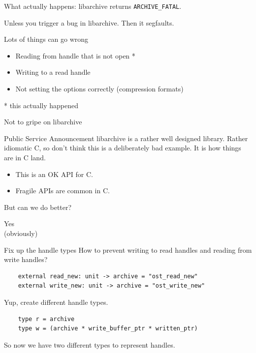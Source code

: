 \documentclass{beamer}
\renewcommand{\example}[1]{{\usebeamercolor[fg]{example text} #1}}
\begin{document}
\begin{frame}
  What actually happens: libarchive returns \texttt{ARCHIVE\_FATAL}.\pause

  Unless you trigger a bug in libarchive. \pause
  \alert{Then it segfaults.}
\end{frame}

\begin{frame}{Lots of things can go wrong}
  \begin{itemize}
    \item Reading from handle that is not open *
    \item Writing to a read handle
    \item Not setting the options correctly (compression formats)
  \end{itemize}
  \pause
  * this actually happened
\end{frame}

\begin{frame}{Not to gripe on libarchive}
  \begin{exampleblock}{Public Service Announcement}
    libarchive is a rather well designed library. Rather idiomatic C, so don't
    think this is a deliberately bad example. It is how things are in C land.
  \end{exampleblock}

  \begin{itemize}
    \item This is an OK API for C.
    \item Fragile APIs are common in C.
  \end{itemize}

  \vspace{2ex}
  \pause
  \begin{center}
    {\Large But can we do better?}
  \end{center}
\end{frame}

\begin{frame}
  \begin{center}
    {\Huge \example{Yes}}\\
    \pause
    {\scriptsize (obviously)}
  \end{center}
\end{frame}

\begin{frame}[fragile]{Fix up the handle types}
  How to prevent writing to read handles and reading from write handles?
  \begin{verbatim}
    external read_new: unit -> archive = "ost_read_new"
    external write_new: unit -> archive = "ost_write_new"
  \end{verbatim}
  \pause
  Yup, create different handle types.
  \begin{verbatim}
    type r = archive
    type w = (archive * write_buffer_ptr * written_ptr)
  \end{verbatim}
  So now we have two different types to represent handles.
\end{frame}
\end{document}
